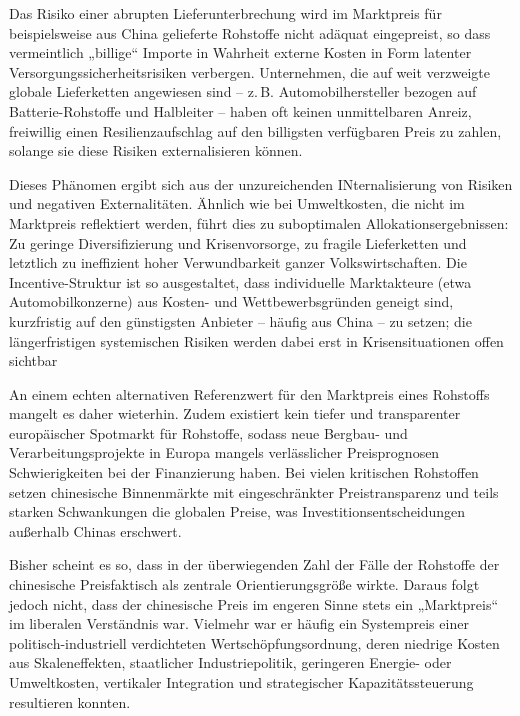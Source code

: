 \documentclass[12pt,a4paper,oneside]{book} %
\begin{document}
 Das Risiko einer abrupten Lieferunterbrechung wird im Marktpreis für beispielsweise aus China gelieferte Rohstoffe nicht adäquat eingepreist, so dass vermeintlich „billige“ Importe in Wahrheit externe Kosten in Form latenter Versorgungssicherheitsrisiken verbergen. Unternehmen, die auf weit verzweigte globale Lieferketten angewiesen sind – z. B. Automobilhersteller bezogen auf Batterie-Rohstoffe und Halbleiter – haben oft keinen unmittelbaren Anreiz, freiwillig einen Resilienzaufschlag auf den billigsten verfügbaren Preis zu zahlen, solange sie diese Risiken externalisieren können.
 
 Dieses Phänomen ergibt sich aus der unzureichenden INternalisierung von Risiken und negativen Externalitäten. Ähnlich wie bei Umweltkosten, die nicht im Marktpreis reflektiert werden, führt dies zu suboptimalen Allokationsergebnissen: Zu geringe Diversifizierung und Krisenvorsorge, zu fragile Lieferketten und letztlich zu ineffizient hoher Verwundbarkeit ganzer Volkswirtschaften. Die Incentive-Struktur ist so ausgestaltet, dass individuelle Marktakteure (etwa Automobilkonzerne) aus Kosten- und Wettbewerbsgründen geneigt sind, kurzfristig auf den günstigsten Anbieter – häufig aus China – zu setzen; die längerfristigen systemischen Risiken werden dabei erst in Krisensituationen offen sichtbar

An einem echten alternativen Referenzwert für den Marktpreis eines Rohstoffs mangelt es daher wieterhin. Zudem existiert kein tiefer und transparenter europäischer Spotmarkt für Rohstoffe, sodass neue Bergbau- und Verarbeitungsprojekte in Europa mangels verlässlicher Preisprognosen Schwierigkeiten bei der Finanzierung haben. Bei vielen kritischen Rohstoffen setzen chinesische Binnenmärkte mit eingeschränkter Preistransparenz und teils starken Schwankungen die globalen Preise, was Investitionsentscheidungen außerhalb Chinas erschwert.

Bisher scheint es so, dass in der überwiegenden Zahl der Fälle der Rohstoffe der \glqq chinesische Preis\grqq faktisch als zentrale Orientierungsgröße wirkte. Daraus folgt jedoch nicht, dass der chinesische Preis im engeren Sinne stets ein „Marktpreis“ im liberalen Verständnis war. Vielmehr war er häufig ein Systempreis einer politisch-industriell verdichteten Wertschöpfungsordnung, deren niedrige Kosten aus Skaleneffekten, staatlicher Industriepolitik, geringeren Energie- oder Umweltkosten, vertikaler Integration und strategischer Kapazitätssteuerung resultieren konnten.
\end{document}
